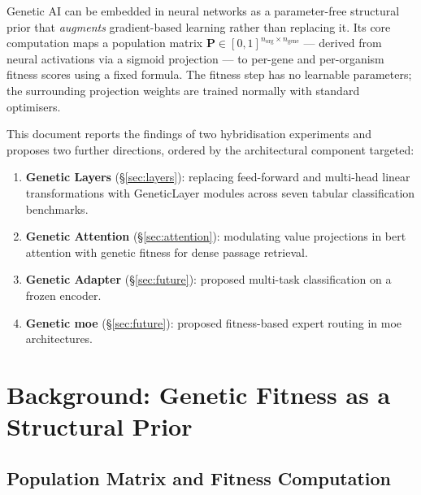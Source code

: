 \documentclass[10pt, a4paper, twocolumn]{article}
\begin{document}
Genetic AI can be embedded in neural networks as a parameter-free structural prior that \emph{augments} gradient-based learning rather than replacing it. Its core computation maps a population matrix $\mathbf{P}\in[0,1]^{n_\mathrm{org}\times n_\mathrm{gene}}$ — derived from neural activations via a sigmoid projection — to per-gene and per-organism fitness scores using a fixed formula. The fitness step has no learnable parameters; the surrounding projection weights are trained normally with standard optimisers.

This document reports the findings of two hybridisation experiments and proposes two further directions, ordered by the architectural component targeted:

\begin{enumerate}[leftmargin=1.5em, itemsep=1pt, topsep=2pt]
  \item \textbf{Genetic Layers} (\S\ref{sec:layers}): replacing feed-forward and multi-head linear transformations with \textsf{GeneticLayer} modules across seven tabular classification benchmarks.
  \item \textbf{Genetic Attention} (\S\ref{sec:attention}): modulating value projections in \acs{bert} attention with genetic fitness for dense passage retrieval.
  \item \textbf{Genetic Adapter} (\S\ref{sec:future}): proposed multi-task classification on a frozen encoder.
  \item \textbf{Genetic \acs{moe}} (\S\ref{sec:future}): proposed fitness-based expert routing in \acs{moe} architectures.
\end{enumerate}

\section{Background: Genetic Fitness as a Structural Prior}

\subsection*{Population Matrix and Fitness Computation}
\end{document}
